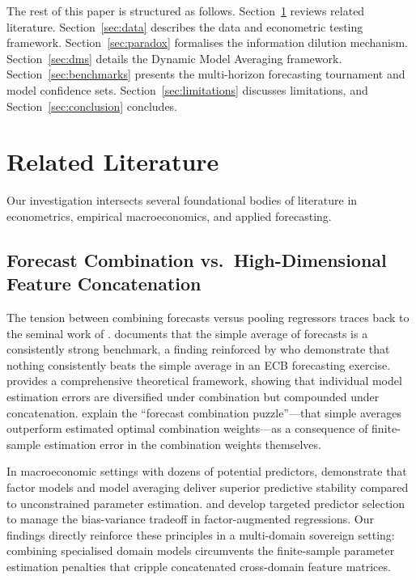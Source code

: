\documentclass[11pt,a4paper]{article}
\begin{document}
The rest of this paper is structured as follows. Section~\ref{sec:literature} reviews related literature. Section~\ref{sec:data} describes the data and econometric testing framework. Section~\ref{sec:paradox} formalises the information dilution mechanism. Section~\ref{sec:dms} details the Dynamic Model Averaging framework. Section~\ref{sec:benchmarks} presents the multi-horizon forecasting tournament and model confidence sets. Section~\ref{sec:limitations} discusses limitations, and Section~\ref{sec:conclusion} concludes.




\section{Related Literature}
\label{sec:literature}

Our investigation intersects several foundational bodies of literature in econometrics, empirical macroeconomics, and applied forecasting.

\subsection{Forecast Combination vs.\ High-Dimensional Feature Concatenation}

The tension between combining forecasts versus pooling regressors traces back to the seminal work of \citet{bates1969}. \citet{clemen1989} documents that the simple average of forecasts is a consistently strong benchmark, a finding reinforced by \citet{genre2013} who demonstrate that nothing consistently beats the simple average in an ECB forecasting exercise. \citet{timmermann2006} provides a comprehensive theoretical framework, showing that individual model estimation errors are diversified under combination but compounded under concatenation. \citet{smithwallis2009} explain the ``forecast combination puzzle''---that simple averages outperform estimated optimal combination weights---as a consequence of finite-sample estimation error in the combination weights themselves.

In macroeconomic settings with dozens of potential predictors, \citet{stock2002, stock2004, stock2006} demonstrate that factor models and model averaging deliver superior predictive stability compared to unconstrained parameter estimation. \citet{bai2006} and \citet{bai2008} develop targeted predictor selection to manage the bias-variance tradeoff in factor-augmented regressions. Our findings directly reinforce these principles in a multi-domain sovereign setting: combining specialised domain models circumvents the finite-sample parameter estimation penalties that cripple concatenated cross-domain feature matrices.
\end{document}
